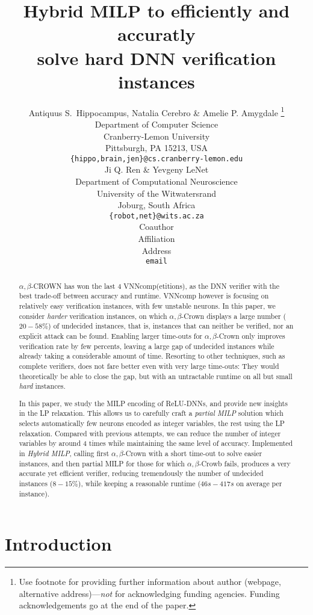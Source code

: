 \documentclass{article} %
\title{Hybrid MILP to efficiently and accuratly \\  solve hard DNN verification instances}
\author{Antiquus S.~Hippocampus, Natalia Cerebro \& Amelie P. Amygdale \thanks{ Use footnote for providing further information
about author (webpage, alternative address)---\emph{not} for acknowledging
funding agencies.  Funding acknowledgements go at the end of the paper.} \\
Department of Computer Science\\
Cranberry-Lemon University\\
Pittsburgh, PA 15213, USA \\
\texttt{\{hippo,brain,jen\}@cs.cranberry-lemon.edu} \\
\And
Ji Q. Ren \& Yevgeny LeNet \\
Department of Computational Neuroscience \\
University of the Witwatersrand \\
Joburg, South Africa \\
\texttt{\{robot,net\}@wits.ac.za} \\
\AND
Coauthor \\
Affiliation \\
Address \\
\texttt{email}
}
\theoremstyle{definition}
\begin{document}
\maketitle

\begin{abstract}
$\alpha,\beta$-CROWN has won the last 4 VNNcomp(etitions), as the DNN verifier with the best 
trade-off between accuracy and runtime. VNNcomp however is focusing on relatively easy verification instances, with few unstable neurons. In this paper, we consider {\em harder} verification instances, on which $\alpha,\beta$-Crown displays a large number ($20-58\%$) of undecided instances, that is, instances that can neither be verified, nor an explicit attack can be found. Enabling larger time-outs for $\alpha,\beta$-Crown only improves verification rate by few percents, leaving a large gap of undecided instances while already taking a considerable amount of time. Resorting to other techniques, such as complete verifiers, does not fare better even with very large time-outs: They would theoretically be able to close the gap, but with an untractable runtime on all but small {\em hard} instances.

In this paper, we study the MILP encoding of ReLU-DNNs, and provide new insights in the LP relaxation. This allows us to carefully craft a {\em partial MILP} solution which selects automatically few neurons encoded as integer variables, the rest using the LP relaxation. Compared with previous attempts, we can reduce the number of integer variables by around 4 times while maintaining the same level of accuracy. Implemented in {\em Hybrid MILP}, calling first $\alpha,\beta$-Crown with a short time-out to solve easier instances, and then partial MILP for those for which $\alpha,\beta$-Crowb fails, produces a very accurate yet efficient verifier, reducing tremendously the number of undecided instances ($8-15\%$), while keeping a reasonable runtime ($46s-417s$ on average per instance).
\end{abstract}












	\section{Introduction}


%

\end{document}
